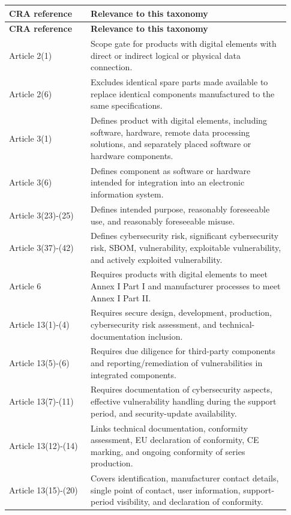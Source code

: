 \documentclass[10pt,a4paper,oneside]{report}
\begin{document}
\begingroup
\scriptsize
\setlength{\tabcolsep}{4pt}
\begin{longtable}{@{}>{\RaggedRight\arraybackslash}p{0.27\linewidth}>{\RaggedRight\arraybackslash}p{0.66\linewidth}@{}}
\toprule
\textbf{CRA reference} & \textbf{Relevance to this taxonomy} \\
\midrule
\endfirsthead
\toprule
\textbf{CRA reference} & \textbf{Relevance to this taxonomy} \\
\midrule
\endhead
Article 2(1) & Scope gate for products with digital elements with direct or indirect logical or physical data connection. \\
Article 2(6) & Excludes identical spare parts made available to replace identical components manufactured to the same specifications. \\
Article 3(1) & Defines product with digital elements, including software, hardware, remote data processing solutions, and separately placed software or hardware components. \\
Article 3(6) & Defines component as software or hardware intended for integration into an electronic information system. \\
Article 3(23)-(25) & Defines intended purpose, reasonably foreseeable use, and reasonably foreseeable misuse. \\
Article 3(37)-(42) & Defines cybersecurity risk, significant cybersecurity risk, SBOM, vulnerability, exploitable vulnerability, and actively exploited vulnerability. \\
Article 6 & Requires products with digital elements to meet Annex I Part I and manufacturer processes to meet Annex I Part II. \\
Article 13(1)-(4) & Requires secure design, development, production, cybersecurity risk assessment, and technical-documentation inclusion. \\
Article 13(5)-(6) & Requires due diligence for third-party components and reporting/remediation of vulnerabilities in integrated components. \\
Article 13(7)-(11) & Requires documentation of cybersecurity aspects, effective vulnerability handling during the support period, and security-update availability. \\
Article 13(12)-(14) & Links technical documentation, conformity assessment, EU declaration of conformity, CE marking, and ongoing conformity of series production. \\
Article 13(15)-(20) & Covers identification, manufacturer contact details, single point of contact, user information, support-period visibility, and declaration of conformity. \\

\end{longtable}
\end{document}
